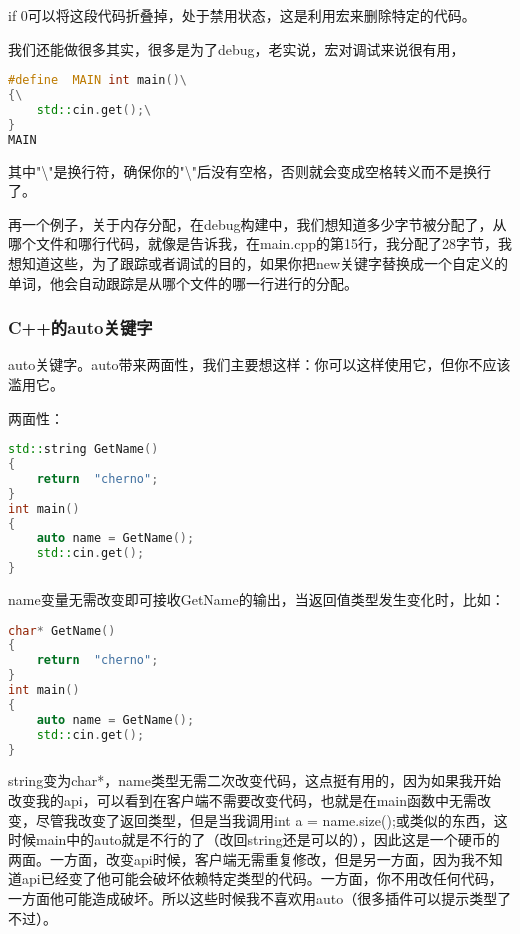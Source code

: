 {\ncodestyle if 0}可以将这段代码折叠掉，处于禁用状态，这是利用宏来删除特定的代码。

我们还能做很多其实，很多是为了debug，老实说，宏对调试来说很有用，

\begin{lstlisting}[language=c++]
#define  MAIN int main()\
{\
    std::cin.get();\
}
MAIN
\end{lstlisting}

其中"\textbackslash"是换行符，确保你的"\textbackslash"后没有空格，否则就会变成空格转义而不是换行了。

再一个例子，关于内存分配，在debug构建中，我们想知道多少字节被分配了，从哪个文件和哪行代码，就像是告诉我，在main.cpp的第15行，我分配了28字节，我想知道这些，为了跟踪或者调试的目的，如果你把new关键字替换成一个自定义的单词，他会自动跟踪是从哪个文件的哪一行进行的分配。


\subsubsection{C++的auto关键字}

{\ncodestyle auto}关键字。{\ncodestyle auto}带来两面性，我们主要想这样：你可以这样使用它，但你不应该滥用它。

两面性：

\begin{lstlisting}[language=c++]
std::string GetName()
{
    return  "cherno";
}
int main()
{
    auto name = GetName();
    std::cin.get();
}
\end{lstlisting}

{\ncodestyle name}变量无需改变即可接收{\ncodestyle GetName}的输出，当返回值类型发生变化时，比如：

\begin{lstlisting}[language=c++]
char* GetName()
{
    return  "cherno";
}
int main()
{
    auto name = GetName();
    std::cin.get();
}
\end{lstlisting}

{\ncodestyle string}变为{\ncodestyle char*}，{\ncodestyle name}类型无需二次改变代码，这点挺有用的，因为如果我开始改变我的api，可以看到在客户端不需要改变代码，也就是在{\ncodestyle main}函数中无需改变，尽管我改变了返回类型，但是当我调用{\ncodestyle int a = name.size();}或类似的东西，这时候{\ncodestyle main}中的{\ncodestyle auto}就是不行的了（改回{\ncodestyle string}还是可以的），因此这是一个硬币的两面。一方面，改变api时候，客户端无需重复修改，但是另一方面，因为我不知道api已经变了他可能会破坏依赖特定类型的代码。一方面，你不用改任何代码，一方面他可能造成破坏。所以这些时候我不喜欢用{\ncodestyle auto}（很多插件可以提示类型了不过）。

